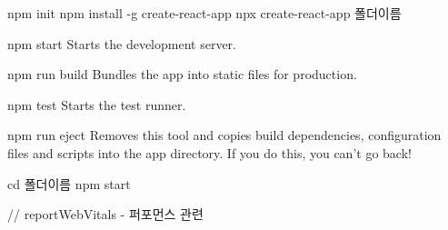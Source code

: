 npm init
npm install -g create-react-app
npx create-react-app 폴더이름

npm start
Starts the development server.

npm run build
Bundles the app into static files for production.

npm test
Starts the test runner.

npm run eject
Removes this tool and copies build dependencies, configuration files
and scripts into the app directory. If you do this, you can’t go back!

cd 폴더이름
npm start

// reportWebVitals - 퍼포먼스 관련